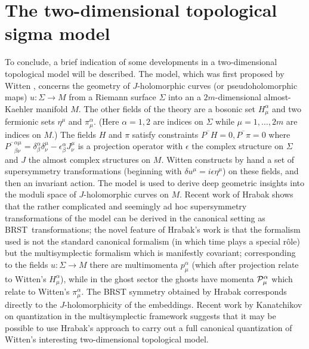 \documentclass[a4paper,fleqn,12pt]{article}
\newcommand{\Etamu}{\eta^{\mu}}
\newcommand{\BRST}{{\small BRST}}
\begin{document}
 \section{The two-dimensional topological sigma \hfil\break model}
%
To conclude, a brief indication of some developments in a
two-dimensional topological model will be described. The model,
which was first proposed by Witten \cite{Witten88}, concerns the
geometry of $J$-holomorphic curves (or pseudoholomorphic maps)
$u:\Sigma \to M$  from a Riemann surface $\Sigma$ into an a
$2m$-dimensional almost-Kaehler manifold $M$. The other fields of
the theory are a bosonic set $H^{\alpha}_{\mu}$ and two fermionic
sets $\Etamu$ and $\pi^{\alpha}_{\mu}$. (Here $\alpha=1,2$ are
indices on $\Sigma$ while $\mu=1,\dots,2 m$ are indices on $M$.)
The fields $H$ and $\pi$ satisfy constraints
 $P^{^{-}}H=0, P^{^{-}}\pi=0$ where
 $P^{^{-}}{}^{\alpha\mu}_{\beta\nu}
 =\delta^{\alpha}_{\beta}\delta^{\mu}_{\nu}-
  \epsilon^{\alpha}_{\beta}J^{\mu}_{\nu}$
is a projection operator with $\epsilon$ the complex structure on
$\Sigma$ and $J$ the almost complex structures on $M$. Witten
constructs by hand a set of supersymmetry transformations
(beginning with $\delta u^{\mu} = i \epsilon \eta^{\mu}$) on these
fields, and then an invariant action. The model is used to derive
deep geometric insights into the moduli space of $J$-holomorphic
curves on $M$. Recent work of Hrabak \cite{Hrabak} shows that the
rather complicated and seemingly ad hoc supersymmetry
transformations of the model can be derived in the canonical
setting as \BRST\ transformations; the novel feature of Hrabak's
work is that the formalism used is not the standard canonical
formalism (in which time plays a special r\^ole) but the
multisymplectic formalism which is manifestly covariant;
corresponding to the fields $u:\Sigma \to M$ there are
multimomenta $p^{\alpha}_{\mu}$ (which after projection relate to
Witten's  $H^{\alpha}_{\mu}$), while in the ghost sector the
ghosts have momenta ${\cal{P}}_{\mu}^{\alpha}$ which relate to
Witten's $\pi^{\alpha}_{\mu}$. The BRST symmetry obtained by
Hrabak corresponds directly to the $J$-holomorphicity of the
embeddings. Recent work by Kanatchikov \cite{Kanatc} on
quantization in the multisymplectic framework suggests that it may
be possible to use Hrabak's approach to carry out a full canonical
quantization of Witten's interesting two-dimensional topological
model.
\end{document}
